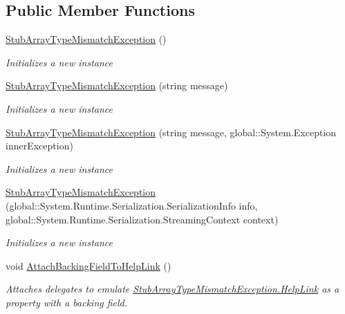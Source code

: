 \subsection*{Public Member Functions}
\begin{DoxyCompactItemize}
\item 
\hyperlink{class_system_1_1_fakes_1_1_stub_array_type_mismatch_exception_a51a0483a9be4b749ab874eff102d97c9}{Stub\-Array\-Type\-Mismatch\-Exception} ()
\begin{DoxyCompactList}\small\item\em Initializes a new instance\end{DoxyCompactList}\item 
\hyperlink{class_system_1_1_fakes_1_1_stub_array_type_mismatch_exception_a0eb2d3015073502ae17bb6bae8d9f394}{Stub\-Array\-Type\-Mismatch\-Exception} (string message)
\begin{DoxyCompactList}\small\item\em Initializes a new instance\end{DoxyCompactList}\item 
\hyperlink{class_system_1_1_fakes_1_1_stub_array_type_mismatch_exception_a9118bdc1c1f5fc02c149ed6e97d53362}{Stub\-Array\-Type\-Mismatch\-Exception} (string message, global\-::\-System.\-Exception inner\-Exception)
\begin{DoxyCompactList}\small\item\em Initializes a new instance\end{DoxyCompactList}\item 
\hyperlink{class_system_1_1_fakes_1_1_stub_array_type_mismatch_exception_ad0605dbfb03b008d60b44da5e36b8107}{Stub\-Array\-Type\-Mismatch\-Exception} (global\-::\-System.\-Runtime.\-Serialization.\-Serialization\-Info info, global\-::\-System.\-Runtime.\-Serialization.\-Streaming\-Context context)
\begin{DoxyCompactList}\small\item\em Initializes a new instance\end{DoxyCompactList}\item 
void \hyperlink{class_system_1_1_fakes_1_1_stub_array_type_mismatch_exception_a4ed5f91486f75528afc3f2fc84bd49aa}{Attach\-Backing\-Field\-To\-Help\-Link} ()
\begin{DoxyCompactList}\small\item\em Attaches delegates to emulate \hyperlink{class_system_1_1_fakes_1_1_stub_array_type_mismatch_exception_a70e3328bd87f09f9bd10168c2316eeb1}{Stub\-Array\-Type\-Mismatch\-Exception.\-Help\-Link} as a property with a backing field.\end{DoxyCompactList}\item 

\end{DoxyCompactItemize}
